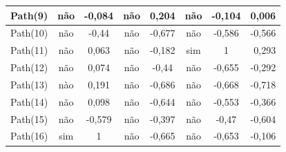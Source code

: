 \begin{table}[htpb]
\begin{tabular}{|l|c|c|c|c|c|c|r|}
            Path(9)            &      não          &   -0,084     &    não            &      0,204  &    não            &      -0,104 &      0,006                     \\ \hline
            Path(10)           &      não          &   -0,44      &    não            &      -0,677 &    não            &      -0,586 &      -0,566                    \\ \hline
            Path(11)           &      não          &   0,063      &    não            &      -0,182 &    sim            &      1      &      0,293                     \\ \hline
            Path(12)           &      não          &   0,074      &    não            &      -0,44  &    não            &      -0,655 &      -0,292                    \\ \hline
            Path(13)           &      nào          &   0,191      &    não            &      -0,686 &    não            &      -0,668 &      -0,718                    \\ \hline
            Path(14)           &      não          &   0,098      &    não            &      -0,644 &    não            &      -0,553 &      -0,366                    \\ \hline
            Path(15)           &      não          &   -0,579     &    não            &      -0,397 &    não            &      -0,47  &      -0,604                    \\ \hline
            Path(16)           &      sim          &   1          &    não            &      -0,665 &    não            &      -0,653 &      -0,106                    \\ \hline
    \end{tabular}
\end{table}

